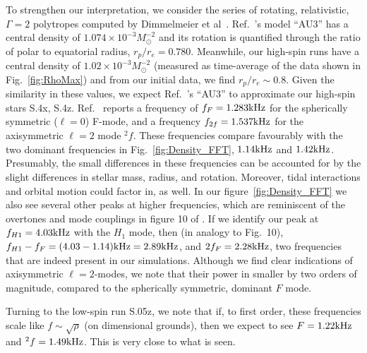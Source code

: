 \documentclass[aps,prd,amsmath,floatfix
,twocolumn
,superscriptaddress,nofootinbib,showpacs]{revtex4-1}
\theoremstyle{plain} \newtheorem{thm}{Theorem} \newtheorem{lem}{Lemma}
\begin{document}
To strengthen our interpretation, we consider the series of rotating,
relativistic, $\Gamma=2$ polytropes computed by Dimmelmeier et
al~\cite{Dimmelmeier:2005zk}. 
%
%
Ref.~\cite{Dimmelmeier:2005zk}'s model ``AU3'' has a central density of
$1.074 \times 10^{-3} M_{\odot}^{-2}$ and its rotation is
quantified through the ratio of polar to equatorial radius,
$r_p/r_e = 0.780$.
Meanwhile, our high-spin runs have a central density of
$1.02 \times 10^{-3} M_{\odot}^{-2}$ (measured as time-average of the data shown in
Fig.~\ref{fig:RhoMax}) and from our initial data, we find
$r_p/r_e \sim 0.8$. Given the similarity in these
values, we expect Ref.~\cite{Dimmelmeier:2005zk}'s ``AU3'' to approximate our high-spin
stars S.4x, S.4z.
Ref.~\cite{Dimmelmeier:2005zk} reports a frequency of
$f_F=1.283\rm{kHz}$ for the spherically symmetric ($\ell=0$) F-mode,
and a frequency $f_{2f}=1.537\rm{kHz}$ for the axisymmetric $\ell=2$
mode $^2f$.  These frequencies compare favourably with the two dominant
frequencies in Fig.~\ref{fig:Density_FFT}, $1.14\rm{kHz}$ and
$1.42\rm{kHz}$.
%
Presumably, the small differences in these frequencies can be
accounted for by the slight differences in stellar mass, radius, and
rotation.  Moreover, tidal interactions and orbital motion could
factor in, as well. In our figure~\ref{fig:Density_FFT} we also see
several other peaks at higher frequencies, which are reminiscent of
the overtones and mode couplings in figure 10 of
\cite{Dimmelmeier:2005zk}. If we identify our peak at
  $f_{H1}=4.03\rm{kHz}$ with the $H_1$ mode, then (in analogy to
  \cite{Dimmelmeier:2005zk} Fig.~10), 
  $f_{H1}-f_{F}=(4.03-1.14)\rm{kHz}=2.89\rm{kHz}$, and
  $2f_{F}=2.28\rm{kHz}$, two frequencies that are indeed present in
  our simulations.
Although we find clear indications of axisymmetric $\ell=2$-modes,
we note that their power in smaller by two orders of magnitude,
compared to the spherically symmetric, dominant $F$ mode. 

Turning to the low-spin run S.05z, we note that if, to first order,
these frequencies scale like $f\sim\sqrt{\rho}$ (on dimensional grounds), then we expect to see
$F=1.22\rm{kHz}$ and $^2f=1.49\rm{kHz}$. This is very close to what is
seen.
\end{document}
